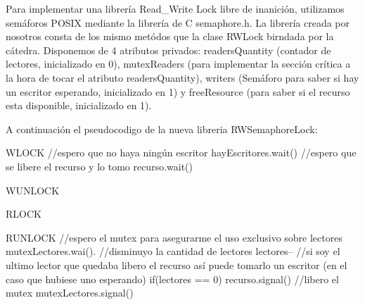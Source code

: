 Para implementar una librería Read_Write Lock libre de inanición, utilizamos semáforos POSIX mediante la librería de C semaphore.h. La librería creada por nosotros consta de los mismo metódos que la clase RWLock birndada por la cátedra. Disponemos de 4 atributos privados: readersQuantity (contador de lectores, inicializado en 0), mutexReaders (para implementar la sección crítica a la hora de tocar el atributo readersQuantity), writers (Semáforo para saber si hay un escritor esperando, inicializado en 1) y freeResource (para saber si el recurso esta disponible, inicializado en 1).

A continuación el pseudocodigo de la nueva libreria RWSemaphoreLock:

WLOCK
//espero que no haya ningún escritor
hayEscritores.wait()
//espero que se libere el recurso y lo tomo
recurso.wait()

WUNLOCK


RLOCK



RUNLOCK
//espero el mutex para asegurarme el uso exclusivo sobre lectores
mutexLectores.wai().
//disminuyo la cantidad de lectores
lectores--
//si soy el ultimo lector que quedaba libero el recurso así puede tomarlo un escritor (en el caso que hubiese uno esperando)
if(lectores == 0)
	recurso.signal()
//libero el mutex
mutexLectores.signal()
